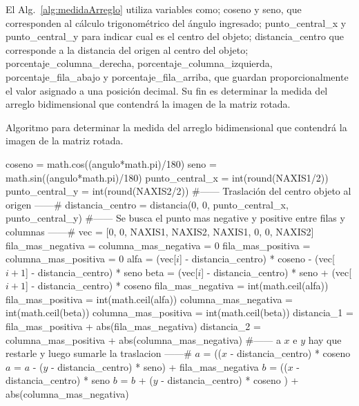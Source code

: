 El Alg.~\ref{alg:medidaArreglo} utiliza variables como; coseno y seno,
que corresponden al cálculo trigonométrico del ángulo ingresado;
punto\_central\_x y punto\_central\_y para indicar cual es el centro
del objeto; distancia\_centro que corresponde a la distancia del origen
al centro del objeto; porcentaje\_columna\_derecha,
porcentaje\_columna\_izquierda, porcentaje\_fila\_abajo y
porcentaje\_fila\_arriba, que guardan proporcionalmente el valor
asignado a una posición decimal. Su fin es determinar la medida del
arreglo bidimensional que contendrá la imagen de la matriz rotada.

\begin{algorithm}
\caption{Algoritmo para determinar la medida del arreglo bidimensional
que contendrá la imagen de la matriz rotada.}\label{alg:medidaArreglo}
\label{alg:medidaArreglo}
\begin{algorithmic}[1]
\STATE coseno = math.cos((angulo*math.pi)/180)
\STATE seno = math.sin((angulo*math.pi)/180)
\STATE punto\_central\_x = int(round(NAXIS1/2))
\STATE punto\_central\_y = int(round(NAXIS2/2))
\STATE \#------ Traslación del centro objeto al origen ------\#
\STATE distancia\_centro = distancia(0, 0, punto\_central\_x, punto\_central\_y)
\STATE \#------ Se busca el punto mas negative y positive entre filas y columnas ------\#
\STATE vec = [0, 0, NAXIS1, NAXIS2, NAXIS1, 0, 0, NAXIS2]
\STATE fila\_mas\_negativa = columna\_mas\_negativa = 0
\STATE fila\_mas\_positiva = columna\_mas\_positiva = 0
\STATE alfa = (vec[$i$] - distancia\_centro) * coseno - (vec[$i + 1$] - distancia\_centro) * seno
\STATE beta = (vec[$i$] - distancia\_centro) * seno + (vec[$i + 1$] - distancia\_centro) * coseno
\STATE fila\_mas\_negativa = int(math.ceil(alfa))
\ENDIF
{}
\STATE fila\_mas\_positiva = int(math.ceil(alfa))
\ENDIF
{}
\STATE columna\_mas\_negativa = int(math.ceil(beta))
\ENDIF
{}
\STATE columna\_mas\_positiva = int(math.ceil(beta))
\ENDIF
\STATE distancia\_1 = fila\_mas\_positiva + abs(fila\_mas\_negativa)
\STATE distancia\_2 = columna\_mas\_positiva + abs(columna\_mas\_negativa)
\STATE \#------ a $x$ e $y$ hay que restarle y luego sumarle la traslacion ------\#
\STATE $a$ = (($x$ - distancia\_centro) * coseno
\STATE $a$ = $a$ - ($y$ - distancia\_centro) * seno) + fila\_mas\_negativa
\STATE $b$ = (($x$ - distancia\_centro) * seno
\STATE $b$ = $b$ + ($y$ - distancia\_centro) * coseno ) + abs(columna\_mas\_negativa)
\ENDWHILE
\ENDWHILE
\ENDWHILE
\end{algorithmic}
\end{algorithm}

